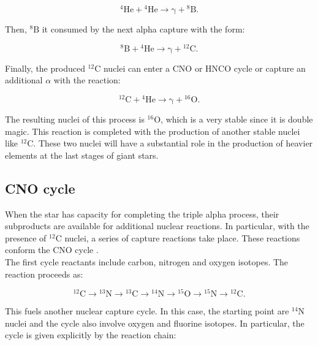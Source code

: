 \documentclass[openany]{book}
\begin{document}
\begin{equation}\label{eq:reaction_tripleAlpha_1}
	\mathrm{{}^{4}He + {}^{4}He \rightarrow  \gamma  + {}^{8}B}.
\end{equation}

Then, $\mathrm{{}^{8}B}$ it consumed by the next alpha capture with the form:

\begin{equation}\label{eq:reaction_tripleAlpha_2}
	\mathrm{{}^{8}B+ {}^{4}He \rightarrow  \gamma + {}^{12}C}. 
\end{equation}

Finally, the produced $\mathrm{{}^{12}C}$ nuclei can enter a CNO or HNCO cycle or capture an additional $\alpha$ with the reaction:

\begin{equation}\label{eq:reaction_tripleAlpha_3}
	\mathrm{{}^{12}C + {}^{4}He \rightarrow \gamma + {}^{16}O}.
\end{equation}

The resulting nuclei of this process is $\mathrm{{}^{16}O}$, which is a very stable since it is double magic. This reaction is completed with the production of another stable nuclei like $\mathrm{{}^{12}C}$. These two nuclei will have a substantial role in the production of heavier elements at the last stages of giant stars.

\subsection{CNO cycle}  \label{sub:CNOCycle}

When the star has capacity for completing the triple alpha process, their subproducts are available for additional nuclear reactions. In particular, with the presence of $\mathrm{{}^{12}C}$ nuclei, a series of capture reactions take place. These reactions conform the CNO cycle  \cite{wiescher_gorres_schatz_1999}. \\

The first cycle reactants include carbon, nitrogen and oxygen isotopes. The reaction proceeds as:  

\begin{equation} \label{eq:reaction_CNO_C}
	\mathrm{{}^{12}C  \rightarrow {}^{13}N  \rightarrow {}^{13}C  \rightarrow {}^{14}N  \rightarrow {}^{15}O  \rightarrow {}^{15}N \rightarrow {}^{12}C}.
\end{equation}

This fuels another nuclear capture cycle. In this case, the starting point are $\mathrm{{}^{14}N}$ nuclei and the cycle also involve oxygen and fluorine isotopes. In particular, the cycle is given explicitly by the reaction chain: 
\end{document}
